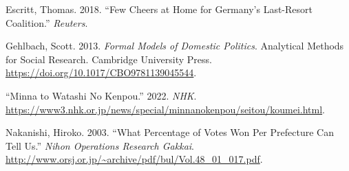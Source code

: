 \documentclass[
]{article}
\newlength{\cslhangindent}
\newlength{\cslentryspacingunit} %
\newenvironment{CSLReferences}[2] %
 {%
  \setlength{\parindent}{0pt}
  \ifodd #1
  \let\oldpar\par
  \def\par{\hangindent=\cslhangindent\oldpar}
  \fi
  \setlength{\parskip}{#2\cslentryspacingunit}
 }%
 {}
\begin{document}
\hypertarget{refs}{}
\begin{CSLReferences}{1}{0}
\leavevmode{}%
Escritt, Thomas. 2018. {``Few Cheers at Home for Germany's Last-Resort
Coalition.''} \emph{Reuters}.

\leavevmode{}%
Gehlbach, Scott. 2013. \emph{Formal Models of Domestic Politics}.
Analytical Methods for Social Research. Cambridge University Press.
\url{https://doi.org/10.1017/CBO9781139045544}.

\leavevmode{}%
{``Minna to Watashi No Kenpou.''} 2022. \emph{NHK}.
\url{https://www3.nhk.or.jp/news/special/minnanokenpou/seitou/koumei.html}.

\leavevmode{}%
Nakanishi, Hiroko. 2003. {``What Percentage of Votes Won Per Prefecture
Can Tell Us.''} \emph{Nihon Operations Research Gakkai}.
\url{http://www.orsj.or.jp/~archive/pdf/bul/Vol.48_01_017.pdf}.

\end{CSLReferences}
\end{document}

